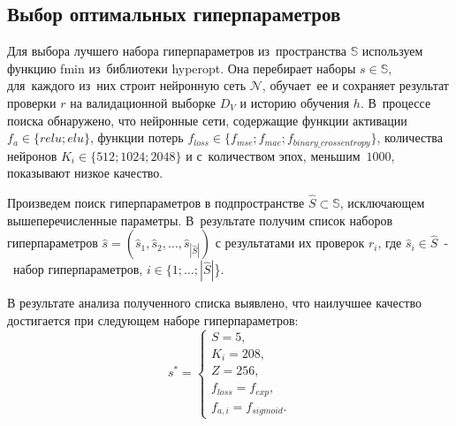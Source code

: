\subsection{Выбор оптимальных гиперпараметров}\label{subsec:opt_hyper}

Для выбора лучшего набора гиперпараметров из~пространства $\mathbb{S}$ используем функцию fmin\cite[раздел FMin]{bib:hyperopt} из~библиотеки hyperopt.
Она перебирает наборы $s \in \mathbb{S}$, для~каждого из~них строит нейронную сеть $\mathcal{N}$, обучает~ее
и сохраняет результат проверки $r$ на валидационной выборке $D_V$ и историю обучения\cite[раздел callbacks]{bib:keras} $h$.
В~процессе поиска обнаружено, что нейронные сети, содержащие функции активации  $f_a \in \{relu; elu\}$, функции потерь $f_{loss} \in \{f_{mse}; f_{mae}; f_{binary\_crossentropy}\}$, количества нейронов $K_i \in \{512; 1024; 2048\}$ и с~количеством эпох, меньшим~$1000$, показывают низкое качество. 

Произведем поиск гиперпараметров в подпространстве $\hat{S} \subset \mathbb{S}$, исключающем вышеперечисленные параметры.
В~результате получим список наборов гиперпараметров $\widehat{s} = (\widehat{s}_1, \widehat{s}_2, \dots, \widehat{s}_{|\hat{S}|})$ с результатами их проверок $r_i$,
где $\widehat{s}_i \in \hat{S}$~-~набор гиперпараметров, $i \in \{1; \dots; |\hat{S}|$\}.

В результате анализа полученного списка выявлено, что наилучшее качество достигается при следующем наборе гиперпараметров:
\begin{equation}\label{eq:hyper_set}
    s^* =
    \begin{cases}
        S = 5, \\
        K_i = 208, \\
        Z = 256, \\        
        f_{loss} = f_{exp}, \\
        f_{a,i} = f_{sigmoid}.
    \end{cases}
\end{equation}


\newpage 